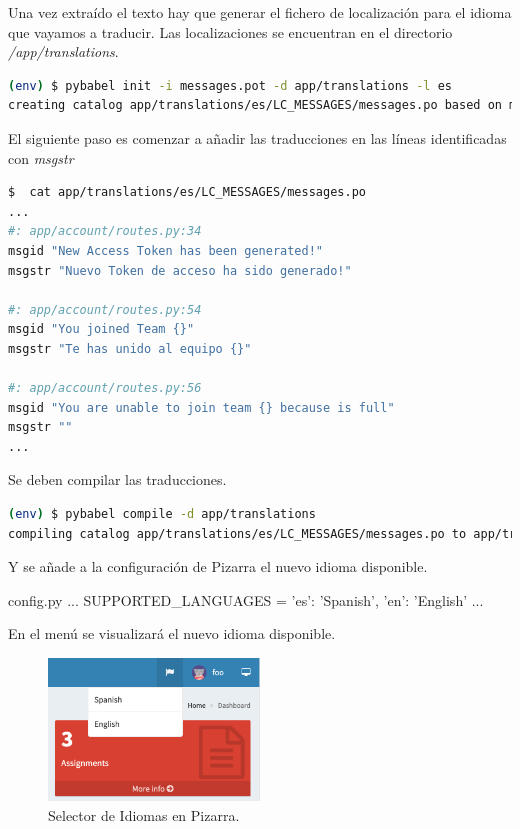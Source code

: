 \documentclass[11pt,spanish,listoffigures,listoftables]{tfgetsinf}
\begin{document}
Una vez extraído el texto hay que generar el fichero de localización para el idioma que vayamos a traducir. Las localizaciones se encuentran en el directorio \textit{/app/translations}. 

\begin{lstlisting}[language=bash]
(env) $ pybabel init -i messages.pot -d app/translations -l es
creating catalog app/translations/es/LC_MESSAGES/messages.po based on messages.pot
\end{lstlisting}

El siguiente paso es comenzar a añadir las traducciones en las líneas identificadas con \textit{msgstr}

\begin{lstlisting}[language=bash]
$  cat app/translations/es/LC_MESSAGES/messages.po
...
#: app/account/routes.py:34
msgid "New Access Token has been generated!"
msgstr "Nuevo Token de acceso ha sido generado!"

#: app/account/routes.py:54
msgid "You joined Team {}"
msgstr "Te has unido al equipo {}"

#: app/account/routes.py:56
msgid "You are unable to join team {} because is full"
msgstr ""
...
\end{lstlisting}

Se deben compilar las traducciones.

\begin{lstlisting}[language=bash]
(env) $ pybabel compile -d app/translations
compiling catalog app/translations/es/LC_MESSAGES/messages.po to app/translations/es/LC_MESSAGES/messages.mo
\end{lstlisting}

Y se añade a la configuración de Pizarra el nuevo idioma disponible.

\begin{code}{config.py}
	...
	SUPPORTED_LANGUAGES = {'es': 'Spanish', 'en': 'English'}
	...
\end{code}

En el menú se visualizará el nuevo idioma disponible.

\begin{figure}[ht]
	\centering
	\includegraphics[width=0.50\textwidth]{img/pizarra-new-language}
	\caption[Selector de Idiomas en Pizarra]{Selector de Idiomas en Pizarra.}
	\label{figura:pizarra-new-language}
\end{figure}
\end{document}
